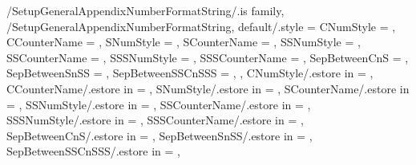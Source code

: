 
\newcommand\GetAppendixFigureNumberFormatString{}
\newcommand\SetupAppendixFigureNumberFormatString
{%
  \renewcommand\GetAppendixFigureNumberFormatString{}%
  \AppendCounterStringToFormatString{%
    \GetAppendixFigureNumberFormatString}{%
    \GetAppendixCTitleNumberFormatCNumStyle}{appendixchapter}%
  \appto\GetAppendixFigureNumberFormatString{.}
  \AppendCounterStringToFormatString{%
    \GetAppendixFigureNumberFormatString}{Arabic}{figure}%
} %


\newcommand\GetAppendixTableNumberFormatString{}
\newcommand\SetupAppendixTableNumberFormatString
{%
  \renewcommand\GetAppendixTableNumberFormatString{}%
  \AppendCounterStringToFormatString{%
    \GetAppendixTableNumberFormatString}{%
    \GetAppendixCTitleNumberFormatCNumStyle}{appendixchapter}%
  \appto\GetAppendixTableNumberFormatString{.}
  \AppendCounterStringToFormatString{%
    \GetAppendixTableNumberFormatString}{Arabic}{table}%
} %


\newcommand\GetAppendixEquationNumberFormatString{}
\newcommand\SetupAppendixEquationNumberFormatString
{%
  \appto\GetAppendixEquationNumberFormatString{}%
  \AppendCounterStringToFormatString{%
    \GetAppendixEquationNumberFormatString}{%
    \GetAppendixCTitleNumberFormatCNumStyle}{appendixchapter}%
  \appto\GetAppendixEquationNumberFormatString{.}
  \AppendCounterStringToFormatString{%
    \GetAppendixEquationNumberFormatString}{Arabic}{equation}%
} %


\pgfkeys
{
  /SetupGeneralAppendixNumberFormatString/.is family, /SetupGeneralAppendixNumberFormatString,
  default/.style =
  {
    CNumStyle = \empty,
    CCounterName = \empty,
    SNumStyle = \empty,
    SCounterName = \empty,
    SSNumStyle = \empty,
    SSCounterName = \empty,
    SSSNumStyle = \empty,
    SSSCounterName = \empty,
    SepBetweenCnS = \empty,
    SepBetweenSnSS = \empty,
    SepBetweenSSCnSSS = \empty,
  },
  CNumStyle/.estore in = \TmpValueCNumStyle,
  CCounterName/.estore in = \TmpValueCCounterName,
  SNumStyle/.estore in = \TmpValueSNumStyle,
  SCounterName/.estore in = \TmpValueSCounterName,
  SSNumStyle/.estore in = \TmpValueSSNumStyle,
  SSCounterName/.estore in = \TmpValueSSCounterName,
  SSSNumStyle/.estore in = \TmpValueSSSNumStyle,
  SSSCounterName/.estore in = \TmpValueSSSCounterName,
  SepBetweenCnS/.estore in = \TmpValueSepBetweenCnS,
  SepBetweenSnSS/.estore in = \TmpValueSepBetweenSnSS,
  SepBetweenSSCnSSS/.estore in = \TmpValueSepBetweenSSCnSSS,
} %

